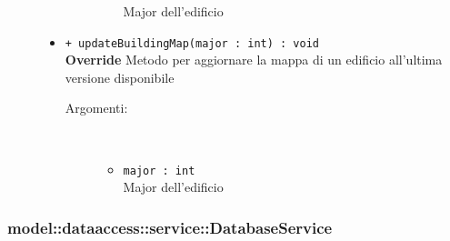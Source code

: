 \documentclass[../DefinizioneDiProdotto.tex]{subfiles}
\begin{document}
\begin{description}
\begin{itemize}
\begin{description}
\begin{itemize}
Major dell'edificio\end{itemize}
\end{description}
\item \texttt{+ updateBuildingMap(major : int) : void}\\
\textbf{Override} Metodo per aggiornare la mappa di un edificio all'ultima versione disponibile
 \begin{description}
\item[Argomenti:] \
\begin{itemize}
\item \texttt{major : int}\\
Major dell'edificio\end{itemize}
\end{description}
\end{itemize}
\end{description}

\subsubsection{model::dataaccess::service::DatabaseService}
\end{document}
